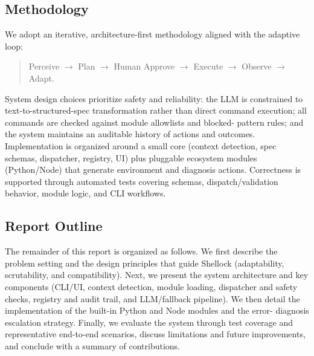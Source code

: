 \documentclass[12pt,a4paper]{article}
\begin{document}
\subsection{Methodology}
We adopt an iterative, architecture-first methodology aligned with the adaptive loop:
\begin{quote}
Perceive $\rightarrow$ Plan $\rightarrow$ Human Approve $\rightarrow$ Execute $\rightarrow$ Observe $\rightarrow$
Adapt.
\end{quote}
System design choices prioritize safety and reliability: the LLM is constrained to text-to-structured-spec
transformation rather than direct command execution; all commands are checked against module allowlists and blocked-
pattern rules; and the system maintains an auditable history of actions and outcomes.\cite{amershi2019,shneiderman2020} Implementation is organized
around a small core (context detection, spec schemas, dispatcher, registry, UI) plus pluggable ecosystem modules
(Python/Node) that generate environment and diagnosis actions. Correctness is supported through automated tests
covering schemas, dispatch/validation behavior, module logic, and CLI workflows.

\subsection{Report Outline}
The remainder of this report is organized as follows. We first describe the problem setting and the design principles
that guide Shellock (adaptability, scrutability, and compatibility). Next, we present the system architecture and key
components (CLI/UI, context detection, module loading, dispatcher and safety checks, registry and audit trail, and
LLM/fallback pipeline). We then detail the implementation of the built-in Python and Node modules and the error-
diagnosis escalation strategy. Finally, we evaluate the system through test coverage and representative end-to-end
scenarios, discuss limitations and future improvements, and conclude with a summary of contributions.

\end{document}
